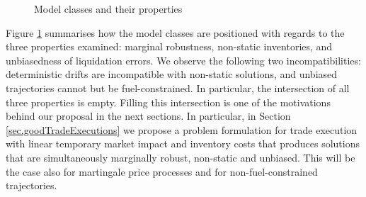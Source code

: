 \documentclass[10pt,a4paper]{article}
\begin{document}
\begin{center}
	\begin{figure}
		\centering
		\caption{Model classes and their properties}
		\label{fig.VennDiagramModelClasses}
	\end{figure}
\end{center}


Figure \ref{fig.VennDiagramModelClasses} summarises how the model classes are positioned with regards to the three properties examined: marginal robustness, non-static inventories, and unbiasedness of liquidation errors. We observe the following two incompatibilities: deterministic drifts are incompatible with non-static solutions, and unbiased trajectories cannot but be fuel-constrained. In particular, the intersection of all three properties is empty. Filling this intersection is one of the motivations behind our proposal in the next sections. In particular, in Section \ref{sec.goodTradeExecutions} we propose a problem formulation for trade execution with linear temporary market impact and inventory costs that produces solutions that are simultaneously marginally robust, non-static and unbiased.  This will be the case also for martingale price processes and for non-fuel-constrained trajectories. 
\end{document}
